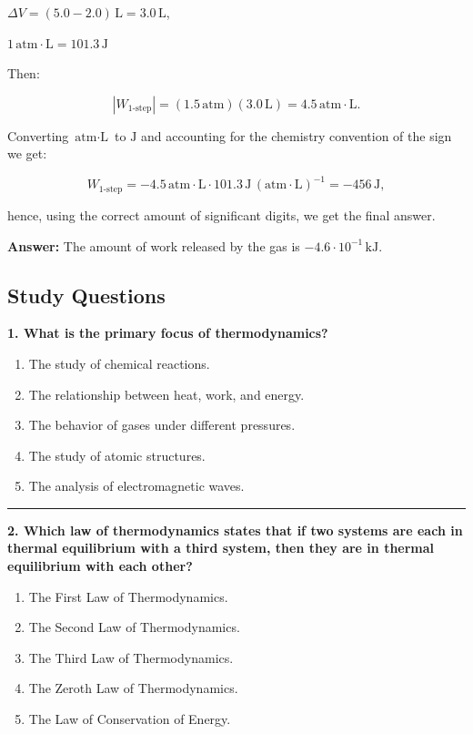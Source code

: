 \documentclass[
  9pt,
]{extbook}
\providecommand{\tightlist}{%
  \setlength{\itemsep}{0pt}\setlength{\parskip}{0pt}}
\theoremstyle{definition}
\theoremstyle{definition}
\theoremstyle{definition}
\theoremstyle{definition}
\theoremstyle{remark}
\begin{document}
\(\Delta V =(5.0-2.0)\,\text{L}=3.0\,\text{L}\),

\(1 \, \text{atm}\cdotp\text{L}=101.3\,\text{J}\)

Then:

\[\left| W_{\text{1-step}} \right|=(1.5\,\text{atm})(3.0\,\text{L}) = 4.5\,\text{atm}\cdotp \text{L}.\]

Converting \(\text{atm}\cdot\text{L}\) to \(\text{J}\) and accounting for the chemistry convention of the sign we get:

\[W_{\text{1-step}}= -4.5\,\text{atm}\cdotp \text{L} \cdot 101.3 \,\text{J}\,(\text{atm}\cdotp\text{L})^{-1} = -456\,\text{J},\]

hence, using the correct amount of significant digits, we get the final answer.

\textbf{Answer:} The amount of work released by the gas is \(-4.6 \cdot 10^{-1}\,\text{kJ}\).

\subsection{Study Questions}\label{quest2}

\textbf{1. What is the primary focus of thermodynamics?}

\begin{enumerate}
\def\labelenumi{\alph{enumi}.}
\tightlist
\item
  The study of chemical reactions.
\item
  The relationship between heat, work, and energy.
\item
  The behavior of gases under different pressures.
\item
  The study of atomic structures.
\item
  The analysis of electromagnetic waves.
\end{enumerate}

\begin{center}\rule{0.5\linewidth}{0.5pt}\end{center}

\textbf{2. Which law of thermodynamics states that if two systems are each in thermal equilibrium with a third system, then they are in thermal equilibrium with each other?}

\begin{enumerate}
\def\labelenumi{\alph{enumi}.}
\tightlist
\item
  The First Law of Thermodynamics.
\item
  The Second Law of Thermodynamics.
\item
  The Third Law of Thermodynamics.
\item
  The Zeroth Law of Thermodynamics.
\item
  The Law of Conservation of Energy.
\end{enumerate}
\end{document}
